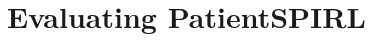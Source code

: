 \chapter{Evaluating PatientSPIRL}
\label{ch:eval}

\begin{comment}
\section{Selecting the simulator}

\begin{table}[]
    \centering
    \begin{tabular}{c|c|c|c}
         Simulator & $\mathcal{O} $ & $\mathcal{A}$ & $p_r(r=0|s) \neq 1$ \\
         \midrule
         simglucose & $[0;+\infty)$ & $[0;35]$ & $S_{nt} \cup S_t$ \\
         GYMIC & $[0;24]^{46}$ & $0,\dots,24$ & $S_{nt} \cup S_t$ \\
         Virtu-ALS & $[0;256]^{307200}$ & $1,\dots,307200$ & $S_{nt} \cup S_t$ \\
         Auto-ALS & $[0;+\infty)^{36}$ & $1,\dots,34$ & $S_{nt} \cup S_t$ \\
         HeartPole & $\mathcal{R}^6$ & $1,\dots,4$ & $S_{nt} \cup S_t$ \\
         GraphSim & $(-\infty;+\infty)^{26}$ & $[0;1]^{317}$ & $S_t$ \\
    \end{tabular}
    \caption{Summary of each simulator: POMDP view}
    \label{tab:structview}
\end{table}

\begin{table*}[]
    \centering
    \begin{tabular}{c|c|c|c|c|c}
         Simulator & Scope & data source & sample size & learning algorithm & known biases \\
         \midrule
         simglucose \cite{simglucose} & type 1 diabetes & original study & 32 & expert model validated on data & \\
         GYMIC \cite{gym-sepsis} & sepsis in intensive care & MIMIC \cite{johnsonMIMICIVFreelyAccessible2023} & 40000 & behavior cloning & overfitting \\
         Virtu-ALS \cite{briskAIEnhanceInteractive2018} & emergency care & & & & confirmation bias \\
         Auto-ALS & emergency care & & & & confirmation bias \\
         HeartPole & healthy lifestyle & & & & no factual basis \\
    \end{tabular}
    \caption{Summary of each simulator: trust view}
    \label{tab:trustview}
\end{table*}


\end{comment}

